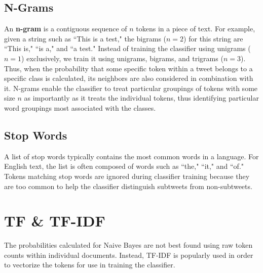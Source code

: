 \documentclass[11pt, twoside, reqno]{book}
\begin{document}
\subsection{N-Grams}
\label{n_grams}

An \textbf{n-gram} is a contiguous sequence of $n$ tokens in a piece of text. For example, given a string such as ``This is a test," the bigrams ($n=2$) for this string are ``This is," ``is a," and ``a test." Instead of training the classifier using unigrams ($n=1$) exclusively, we train it using unigrams, bigrams, and trigrams ($n=3$). Thus, when the probability that some specific token within a tweet belongs to a specific class is calculated, its neighbors are also considered in combination with it. N-grams enable the classifier to treat particular groupings of tokens with some size $n$ as importantly as it treats the individual tokens, thus identifying particular word groupings most associated with the classes.

\subsection{Stop Words}
\label{stop_words}

A list of stop words typically contains the most common words in a language. For English text, the list is often composed of words such as ``the," ``it," and ``of." Tokens matching stop words are ignored during classifier training because they are too common to help the classifier distinguish subtweets from non-subtweets. 

\section{TF \& TF-IDF}
\label{tf_tf_idf}

The probabilities calculated for Naive Bayes are not best found using raw token counts within individual documents. Instead, TF-IDF is popularly used in order to vectorize the tokens for use in training the classifier. 
\end{document}
